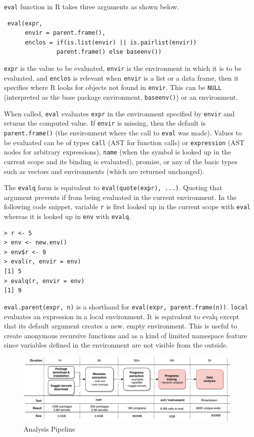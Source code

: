 \documentclass[USenglish,cleveref, autoref, thm-restate]{lipics-v2019}
\newcommand{\eval}{\texttt{eval}\xspace}
\renewcommand{\c}[1]{\lstinline{#1}\xspace}
\begin{document}
\eval function in R takes three arguments as shown below.
\begin{lstlisting}
 eval(expr,
      envir = parent.frame(),
      enclos = if(is.list(envir) || is.pairlist(envir))
               parent.frame() else baseenv())
\end{lstlisting}           

\c{expr} is the value to be evaluated, \c{envir}
is the environment in which it is to be evaluated, and \c{enclos} is
relevant when \c{envir} is a list or a data frame, then it specifies where R
looks for objects not found in \c{envir}. This can be \c{NULL} (interpreted
as the base package environment, \c{baseenv()}) or an environment.

When called, \eval evaluates \c{expr} in the environment specified by
\c{envir} and returns the computed value. If \c{envir} is missing, then the
default is \c{parent.frame()} (the environment where the call to \eval was
made).  Values to be evaluated can be of types \c{call} (AST for function
calls) or \c{expression} (AST nodes for arbitrary expressions), \c{name}
(when the symbol is looked up in the current scope and its binding is
evaluated), promise, or any of the basic types such as vectors and
environments (which are returned unchanged).

The \c{evalq} form is equivalent to \c{eval(quote(expr), ...)}.  Quoting
that argument prevents if from being evaluated in the current environment.
In the following code snippet, variable \c{r} is first looked up in
the current scope with \eval whereas it is looked up in \c{env} with
\c{evalq}.

\begin{lstlisting}
> r <- 5
> env <- new.env()
> env$r <- 9
> eval(r, envir = env)
[1] 5
> evalq(r, envir = env)
[1] 9
\end{lstlisting}

\c{eval.parent(expr, n)} is a shorthand for \c{eval(expr, parent.frame(n))}.
\c{local} evaluates an expression in a local environment. It is equivalent
to evalq except that its default argument creates a new, empty
environment. This is useful to create anonymous recursive functions and as a
kind of limited namespace feature since variables defined in the environment
are not visible from the outside.

\begin{figure}[!t]\centering\includegraphics[width=.8\linewidth]
{pipeline.pdf}\caption{Analysis Pipeline}\label{fig:pipeline}
\end{figure}
\end{document}
